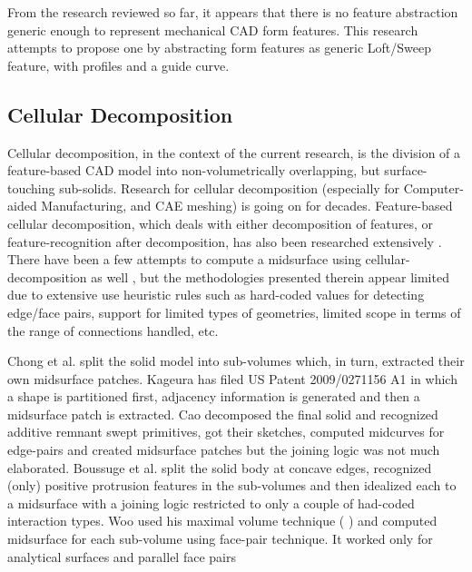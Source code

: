 From the research reviewed so far, it appears that there is no feature abstraction generic enough to represent mechanical CAD form features. This research attempts to propose one by  abstracting form features as generic Loft/Sweep feature, with profiles and a guide curve.
  
 \subsection{Cellular Decomposition}
 
Cellular decomposition, in the context of the current research, is the division of a feature-based CAD model into non-volumetrically overlapping, but surface-touching sub-solids.  Research for  cellular decomposition (especially for Computer-aided Manufacturing, and CAE meshing) is going on for decades. Feature-based cellular decomposition, which deals with either decomposition of features, or feature-recognition after decomposition,  has also been  researched extensively \cite{Bidarra1993, BidarraKrakerBronsvoort1998, Woo2003, JaeLee2004, Treeck, Boussuge2013a, Wu2014, Woo2014}. There have been a few attempts to compute a midsurface using cellular-decomposition as well \cite{Chong2004, Woo2013, Boussuge2013, Zhu2015}, but the methodologies presented therein appear limited due to extensive use heuristic rules such as hard-coded values for detecting edge/face pairs, support for limited types of geometries,   limited scope in terms of the range of connections  handled, etc.

Chong et al. \cite{Chong2004} split the solid model into sub-volumes which, in turn, extracted their own midsurface patches. Kageura \cite{Kageura2009} has filed US Patent 2009/0271156 A1 in which a shape is partitioned first, adjacency information is generated and then a midsurface patch is extracted.  Cao \cite{Cao2009} \cite{Cao2011} decomposed the final solid and recognized additive remnant swept primitives, got their sketches, computed midcurves for edge-pairs and created midsurface patches but the joining logic was not much elaborated. Boussuge et al.  \cite{Boussuge2013,Boussuge2013a}  split the solid body at concave edges, recognized (only) positive  protrusion features in the sub-volumes and then idealized each to a midsurface with a joining logic restricted to only a couple of had-coded interaction types. Woo \cite{Woo2013} used his maximal volume technique (\cite{Woo2006, Woo2009} ) and computed midsurface for each sub-volume using face-pair technique. It worked only for analytical surfaces and parallel face pairs

